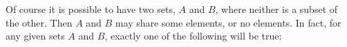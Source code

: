 %

Of course it is possible to have two sets, $A$ and $B$, where
neither is a subset of the other.  Then $A$ and $B$ may share
some elements, or no elements.  In fact, for any given sets
$A$ and $B$, exactly one of the following will be true:

